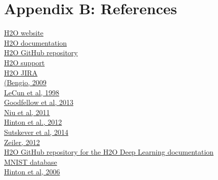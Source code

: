 \documentclass[11pt]{article}
\begin{document}
\section{Appendix B: References}
\href{http://h2o.ai/}{H2O website}
\\\href{http://docs.h2oai.com}{H2O documentation} 
\\\href{https://github.com/h2oai/h2o/tree/master/docs/deeplearning/DeepLearningRVignetteDemo}{H2O GitHub repository}
\\\href{mailto:h2ostream@googlegroups.com}{H2O support}
\\\href{https://0xdata.atlassian.net/secure/Dashboard.jspa}{H2O JIRA}
\\\href{http://www.iro.umontreal.ca/~lisa/pointeurs/TR1312.pdf}{(Bengio, 2009}
\\\href{http://yann.lecun.com/exdb/publis/pdf/lecun-98b.pdf}{LeCun et al, 1998}
\\\href{http://arxiv.org/pdf/1302.4389.pdf}{Goodfellow et al, 2013}
\\\href{http://i.stanford.edu/hazy/papers/hogwild-nips.pdf}{Niu et al, 2011}
\\\href{http://arxiv.org/pdf/1207.0580.pdf}{Hinton et al., 2012}
\\\href{http://www.cs.toronto.edu/~fritz/absps/momentum.pdf}{Sutskever et al, 2014}
\\\href{http://arxiv.org/pdf/1212.5701v1.pdf}{Zeiler, 2012}
\\\href{https://github.com/h2oai/h2o/tree/master/docs/deeplearning/DeepLearningRVignetteDemo}{H2O GitHub repository for the H2O Deep Learning documentation}
\\\href{http://yann.lecun.com/exdb/mnist/}{MNIST database}
\\\href{http://www.cs.toronto.edu/~hinton/science.pdf}{Hinton et al, 2006}
\end{document}
